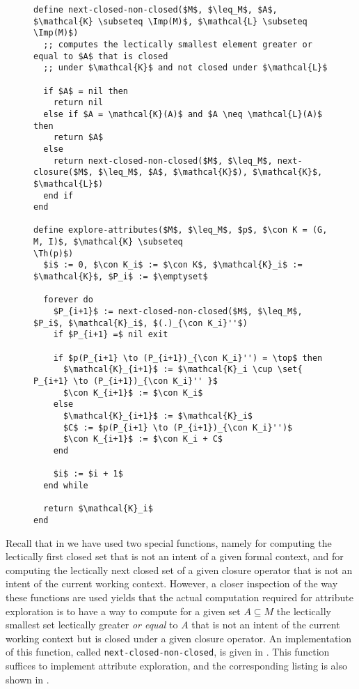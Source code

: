 \begin{figure}[tp]
  \begin{Algorithm}
  \label{alg:explore-attributes-with-next-closed-none-closed}
  \hspace*{0cm}
\begin{lstlisting}
define next-closed-non-closed($M$, $\leq_M$, $A$, $\mathcal{K} \subseteq \Imp(M)$, $\mathcal{L} \subseteq \Imp(M)$)
  ;; computes the lectically smallest element greater or equal to $A$ that is closed
  ;; under $\mathcal{K}$ and not closed under $\mathcal{L}$

  if $A$ = nil then
    return nil
  else if $A = \mathcal{K}(A)$ and $A \neq \mathcal{L}(A)$ then
    return $A$
  else
    return next-closed-non-closed($M$, $\leq_M$, next-closure($M$, $\leq_M$, $A$, $\mathcal{K}$), $\mathcal{K}$, $\mathcal{L}$)
  end if
end

define explore-attributes($M$, $\leq_M$, $p$, $\con K = (G, M, I)$, $\mathcal{K} \subseteq
\Th(p)$)
  $i$ := 0, $\con K_i$ := $\con K$, $\mathcal{K}_i$ := $\mathcal{K}$, $P_i$ := $\emptyset$

  forever do
    $P_{i+1}$ := next-closed-non-closed($M$, $\leq_M$, $P_i$, $\mathcal{K}_i$, $(.)_{\con K_i}''$)
    if $P_{i+1} =$ nil exit

    if $p(P_{i+1} \to (P_{i+1})_{\con K_i}'') = \top$ then
      $\mathcal{K}_{i+1}$ := $\mathcal{K}_i \cup \set{ P_{i+1} \to (P_{i+1})_{\con K_i}'' }$
      $\con K_{i+1}$ := $\con K_i$
    else
      $\mathcal{K}_{i+1}$ := $\mathcal{K}_i$
      $C$ := $p(P_{i+1} \to (P_{i+1})_{\con K_i}'')$
      $\con K_{i+1}$ := $\con K_i + C$
    end

    $i$ := $i + 1$
  end while

  return $\mathcal{K}_i$  
end
\end{lstlisting}
  \end{Algorithm}
\end{figure}

Recall that in  we have used two special functions, namely
for computing the lectically first closed set that is not an intent of a given formal
context, and for computing the lectically next closed set of a given closure operator that
is not an intent of the current working context.  However, a closer inspection of the way
these functions are used yields that the actual computation required for attribute
exploration is to have a way to compute for a given set $A \subseteq M$ the lectically
smallest set lectically greater \emph{or equal} to $A$ that is not an intent of the
current working context but is closed under a given closure operator.  An implementation
of this function, called \lstinline{next-closed-non-closed}, is given in
.  This function suffices to
implement attribute exploration, and the corresponding listing is also shown in
.

